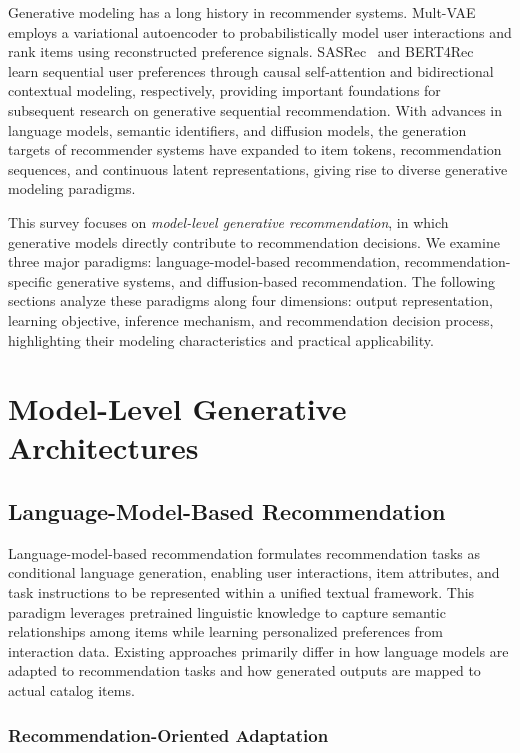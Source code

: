 \documentclass[sigconf,nonacm]{acmart}
\begin{document}
Generative modeling has a long history in recommender
systems. Mult-VAE~\cite{multvae} employs a
variational autoencoder to probabilistically model user
interactions and rank items using reconstructed preference
signals. SASRec~\cite{sasrec} and
BERT4Rec~\cite{bert4rec} learn sequential user
preferences through causal self-attention and bidirectional
contextual modeling, respectively, providing important
foundations for subsequent research on generative sequential
recommendation. With advances in language models, semantic
identifiers, and diffusion models, the generation targets of
recommender systems have expanded to item tokens,
recommendation sequences, and continuous latent
representations, giving rise to diverse generative modeling
paradigms.

This survey focuses on \emph{model-level generative
recommendation}, in which generative models directly
contribute to recommendation decisions. We examine three
major paradigms: language-model-based recommendation,
recommendation-specific generative systems, and
diffusion-based recommendation. The following sections
analyze these paradigms along four dimensions: output
representation, learning objective, inference mechanism,
and recommendation decision process, highlighting their
modeling characteristics and practical applicability.

\section{Model-Level Generative Architectures}
\label{sec:architectures}


\subsection{Language-Model-Based Recommendation}
\label{sec:lm}

Language-model-based recommendation formulates recommendation
tasks as conditional language generation, enabling user
interactions, item attributes, and task instructions to be
represented within a unified textual framework. This paradigm
leverages pretrained linguistic knowledge to capture semantic
relationships among items while learning personalized preferences
from interaction data. Existing approaches primarily differ in
how language models are adapted to recommendation tasks and
how generated outputs are mapped to actual catalog items.

\subsubsection{Recommendation-Oriented Adaptation}
\end{document}
